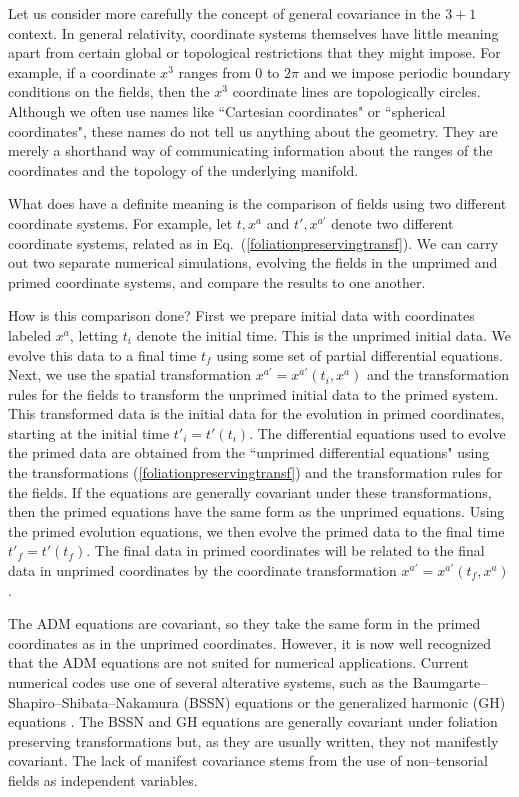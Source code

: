 \documentclass[letterpaper,nofootinbib,prd,amsmath,onecolumn]{revtex4-1}
\begin{document}
Let us consider more carefully the concept of general covariance in the $3+1$ context. 
In general relativity, coordinate systems themselves have little meaning apart from certain 
global or topological restrictions that they might impose. For example, if a coordinate $x^3$ ranges from $0$ to $2\pi$ 
and we impose periodic boundary conditions on the fields, then the $x^3$ coordinate lines are topologically circles. 
Although we often use names like ``Cartesian coordinates" or ``spherical coordinates", these names do not tell us anything 
about the geometry. They 
are merely a shorthand way of communicating information about the ranges of the coordinates and the topology of the underlying manifold. 

What does have a definite meaning is the comparison of fields using two different coordinate systems. For example, let 
$t,x^{a}$ and $t',x^{a'}$ denote  
two different coordinate systems, related as in Eq.~(\ref{foliationpreservingtransf}). We can carry out two separate numerical simulations, 
evolving the fields in the unprimed and primed coordinate systems, and compare the results to one another.  

How is this comparison done? 
First we prepare initial data with coordinates labeled $x^a$, letting $t_i$ denote the initial time. This is the unprimed initial data. We evolve this data to a final 
time $t_f$ using some set of partial differential equations. Next, we use 
the spatial transformation $x^{a'} = x^{a'}(t_i,x^a)$ and the transformation rules for the fields to transform the unprimed initial data to the primed 
system. This transformed data is the initial data for the evolution in primed coordinates, starting at the initial time $t'_i = t'(t_i)$. 
The differential equations used to evolve the primed data are obtained from the ``unprimed differential equations" using the transformations (\ref{foliationpreservingtransf}) and 
the transformation rules for the fields. If the equations are generally covariant under these transformations, then the primed equations have the same form 
as the unprimed equations. Using the primed evolution equations, we then evolve the primed data to the final 
time $t'_f = t'(t_f)$. The final data in primed coordinates will be related to the final data in unprimed coordinates by the coordinate transformation 
$x^{a'} = x^{a'}(t_f,x^a)$. 

The ADM equations are covariant, so they take the same form in the primed coordinates as in the unprimed coordinates. However, it is now 
well recognized that the ADM equations 
are not suited for numerical applications. Current numerical codes use one of several alterative systems, such as the 
Baumgarte--Shapiro--Shibata--Nakamura (BSSN) equations \cite{Shibata:1995we,Baumgarte:1998te} or the generalized harmonic (GH) 
equations \cite{Friedrich:1985,Garfinkle:2001ni}.
The BSSN and GH equations are generally covariant under foliation preserving transformations but, as they are usually written, 
they not manifestly covariant. The lack of manifest covariance stems from the use of non--tensorial fields as independent variables. 
\end{document}
